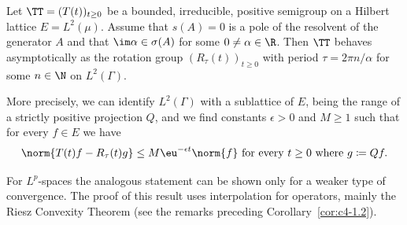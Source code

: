 \begin{proposition}\label{prop:c4-2.13}
Let $\TT = (T(t))_{t\geq 0}$ be a bounded, irreducible, positive semigroup on a Hilbert lattice $E = L^{2}(\mu)$.
Assume that $s(A) = 0$ is a pole of the resolvent of the generator $A$ and that $\im\alpha \in \sigma(A)$ for some $0 \neq \alpha \in \R$.
Then $\TT$ behaves asymptotically as the rotation group $(R_{\tau}(t))_{t \geq 0}$ with period $\tau = 2\pi n/\alpha$ for some $n \in \N$ on $L^{2}(\Gamma)$.

More precisely, we can identify $L^{2}(\Gamma)$ with a sublattice of\/ $E$, being the range of a strictly positive projection $Q$, and we find constants $\epsilon > 0$ and $M \geq 1$ such that for every $f \in E$ we have
\begin{equation}\label{eq:c4-2.11}
\norm{T(t)f - R_{\tau}(t)g} \leq M\eu^{-\epsilon t}\norm{f} \text{ for every } t \geq 0 \text{ where } g \coloneqq Qf.
\end{equation}
\end{proposition}
For $L^{p}$-spaces the analogous statement can be shown only for a weaker type of convergence.
The proof of this result uses interpolation for operators, mainly the Riesz Convexity Theorem (see the remarks preceding Corollary~\ref{cor:c4-1.2}).

